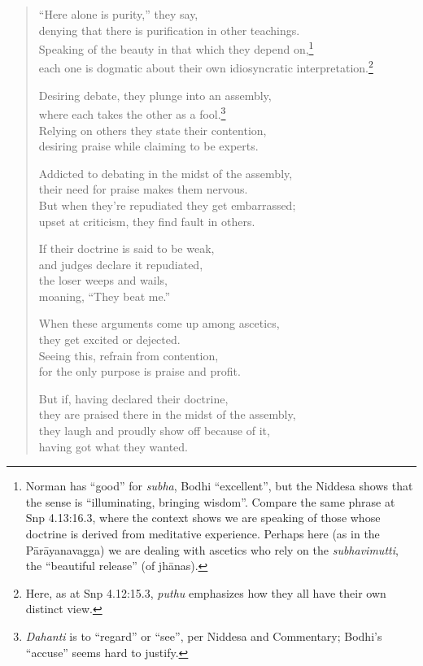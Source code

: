 \documentclass[12pt,openany]{book}%
\begin{document}
\begin{verse}%
“Here alone is purity,” they say, \\
denying that there is purification in other teachings. \\
Speaking of the beauty in that which they depend on,\footnote{Norman has “good” for \textit{subha}, Bodhi “excellent”, but the Niddesa shows that the sense is “illuminating, bringing wisdom”. Compare the same phrase at Snp 4.13:16.3, where the context shows we are speaking of those whose doctrine is derived from meditative experience. Perhaps here (as in the \textsanskrit{Pārāyanavagga}) we are dealing with ascetics who rely on the \textit{subhavimutti}, the “beautiful release” (of \textsanskrit{jhānas}). } \\
each one is dogmatic about their own idiosyncratic interpretation.\footnote{Here, as at Snp 4.12:15.3, \textit{puthu} emphasizes how they all have their own distinct view. } 

Desiring debate, they plunge into an assembly, \\
where each takes the other as a fool.\footnote{\textit{Dahanti} is to “regard” or “see”, per Niddesa and Commentary; Bodhi’s “accuse” seems hard to justify. } \\
Relying on others they state their contention, \\
desiring praise while claiming to be experts. 

Addicted to debating in the midst of the assembly, \\
their need for praise makes them nervous. \\
But when they’re repudiated they get embarrassed; \\
upset at criticism, they find fault in others. 

If their doctrine is said to be weak, \\
and judges declare it repudiated, \\
the loser weeps and wails, \\
moaning, “They beat me.” 

When these arguments come up among ascetics, \\
they get excited or dejected. \\
Seeing this, refrain from contention, \\
for the only purpose is praise and profit. 

But if, having declared their doctrine, \\
they are praised there in the midst of the assembly, \\
they laugh and proudly show off because of it, \\
having got what they wanted. 


\end{verse}
\end{document}
